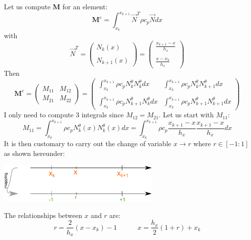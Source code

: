 Let us compute ${\bm M}$ for an element:
\[
{\bm M}^e=  \int_{x_k}^{x_{k+1}}   {\vec N}^T \rho c_p {\vec N} dx  
\]
with 
\[
{\vec N}^T = 
\left(
\begin{array}{c}
N_k(x)  \\ \\  N_{k+1}(x)
\end{array}
\right)
=
\left(
\begin{array}{c}
\frac{x_{k+1}-x}{h_x}   \\ \\
\frac{x-x_k}{h_x} 
\end{array}
\right)
\]
Then 
\[
{\bm M}^e
=
\left(
\begin{array}{cc}
M_{11} & M_{12} \\
M_{21} & M_{22} 
\end{array}
\right)
=
\left(
\begin{array}{cc}
\int_{x_k}^{x_{k+1}} \rho c_p N_k^\theta N_{k}^\theta dx   &  \int_{x_k}^{x_{k+1}} \rho c_p N_k^\theta N_{k+1}^\theta dx \\ \\
\int_{x_k}^{x_{k+1}} \rho c_p N_{k+1}^\theta N_{k}^\theta dx  &  \int_{x_k}^{x_{k+1}} \rho c_p N_{k+1}^\theta N_{k+1}^\theta dx 
\end{array}
\right)
\]
I only need to compute 3 integrals since $M_{12}=M_{21}$.
Let us start with $M_{11}$:
\[
M_{11}=\int_{x_k}^{x_{k+1}} \rho c_p N_k^\theta(x) N_{k}^\theta(x) dx
=   
\int_{x_k}^{x_{k+1}} \rho c_p 
\frac{x_{k+1}-x}{h_x}  
\frac{x_{k+1}-x}{h_x}  
dx
\]
It is then customary to carry out the change of variable $x \rightarrow r$ where 
$r \in [-1:1]$ as shown hereunder:
\begin{center}
\includegraphics[width=8cm]{images/oneD/el1D_mapping}
\end{center}
The relationships between $x$ and $r$ are:
\[
r=\frac{2}{h_x}(x-x_k)-1
\quad\quad\quad
x=\frac{h_x}{2}(1+r)+x_k
\]


